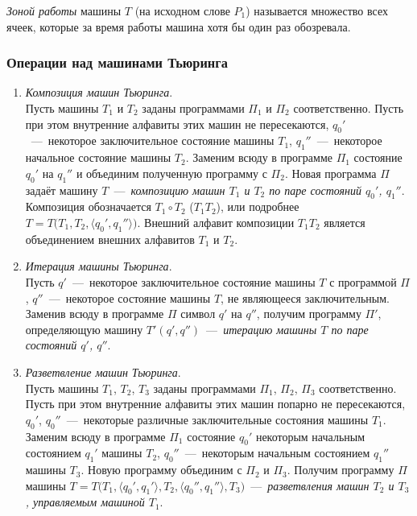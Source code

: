 \textit{Зоной работы} машины $T$ (на исходном слове $P_1$) называется множество всех ячеек, которые за время работы машина хотя бы один раз обозревала.

\subsubsection{Операции над машинами Тьюринга}
\begin{enumerate}
    \item \textit{Композиция машин Тьюринга}. \\
    Пусть машины $T_1$ и $T_2$ заданы программами $\Pi_1$ и $\Pi_2$ соответственно. Пусть при этом внутренние алфавиты этих машин не пересекаются, $q_0'$~---~некоторое заключительное состояние машины $T_1$, $q_1''$~---~некоторое начальное состояние машины $T_2$. Заменим всюду в программе $\Pi_1$ состояние $q_0'$ на $q_1''$ и объединим полученную программу с $\Pi_2$. Новая программа $\Pi$ задаёт машину $T$~---~\textit{композицию машин $T_1$ и $T_2$ по паре состояний $q_0'$, $q_1''$}. Композиция обозначается $T_1\circ T_2$ ($T_1T_2$), или подробнее $T = T\big(T_1, T_2, \langle q_0', q_1''\rangle\big)$. Внешний алфавит композиции $T_1T_2$ является объединением внешних алфавитов $T_1$ и $T_2$.

    \item \textit{Итерация машины Тьюринга}. \\
    Пусть $q'$~---~некоторое заключительное состояние машины $T$ с программой $\Pi$, $q''$~---~некоторое состояние машины $T$, не являющееся заключительным. Заменив всюду в программе $\Pi$ символ $q'$ на $q''$, получим программу $\Pi'$, определяющую машину $T'(q', q'')$~---~\textit{итерацию машины $T$ по паре состояний $q'$, $q''$}.

    \item \textit{Разветвление машин Тьюринга}. \\
    Пусть машины $T_1$, $T_2$, $T_3$ заданы программами $\Pi_1$, $\Pi_2$, $\Pi_3$ соответственно. Пусть при этом внутренние алфавиты этих машин попарно не пересекаются, $q_0'$, $q_0''$~---~некоторые различные заключительные состояния машины $T_1$. Заменим всюду в программе $\Pi_1$ состояние $q_0'$ некоторым начальным состоянием $q_1'$ машины $T_2$, $q_0''$~---~некоторым начальным состоянием $q_1''$ машины $T_3$. Новую программу объединим с $\Pi_2$ и $\Pi_3$. Получим программу $\Pi$ машины $T = T\big(T_1, \langle q_0', q_1'\rangle, T_2, \langle q_0'', q_1''\rangle, T_3\big)$~---~\textit{разветвления машин $T_2$ и $T_3$, управляемым машиной $T_1$}.
\end{enumerate}